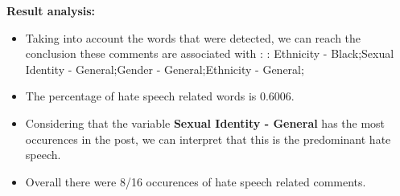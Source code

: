 \documentclass[11pt]{article}
\begin{document}
\textbf{\Large Result analysis:}

\begin{itemize}\item Taking into account the words that were detected, we can reach the conclusion these comments are associated with : : Ethnicity - Black;Sexual Identity - General;Gender - General;Ethnicity - General;%

\item The percentage of hate speech related words is 0.6006.

\item Considering that the variable \textbf{Sexual Identity - General} has the most occurences in the post, we can interpret that this is the predominant hate speech.

\item Overall there were 8/16 occurences of hate speech related comments.\end{itemize}
\end{document}
